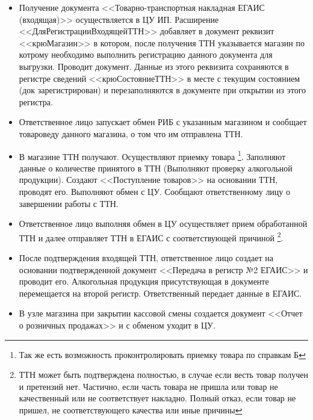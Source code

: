  \begin{itemize}
     \item Получение документа <<Товарно-транспортная накладная ЕГАИС (входящая)>> осуществляется в ЦУ ИП.
     Расширение <<ДляРегистрацииВходящейТТН>> добавляет в документ реквизит <<крюМагазин>> в котором, после получения ТТН указывается магазин по котрому необходимо выполнить регистрацию данного документа для выгрузки. Проводит документ. Данные из этого реквизита сохраняются в регистре сведений <<крюСостояниеТТН>> в месте с текущим состоянием (док зарегистрирован) и перезаполняются в документе при открытии из этого регистра.
     \item  Ответственное лицо запускает обмен РИБ с указанным магазином и сообщает товароведу данного магазина, о том что им отправлена ТТН.
     \item В магазине ТТН получают. Осуществляют приемку товара \footnote{Так же есть возможность проконтролировать приемку товара по справкам Б}. Заполняют данные о количестве принятого в ТТН (Выполняют проверку алкогольной продукции). Создают <<Поступление товаров>> на основании ТТН, проводят его. Выполняют обмен с ЦУ. Сообщают ответственному лицу о завершении работы с ТТН.
     \item Ответственное лицо выполняя обмен в ЦУ осуществляет прием обработанной ТТН и далее отправляет ТТН в ЕГАИС с соответствующей причиной \footnote{ТТН может быть подтверждена полностью, в случае если весть товар получен и претензий нет. Частично, если часть товара не пришла или товар не качественный или не соответствует накладно. Полный отказ, если товар не пришел, не соответствующего качества или иные причины}.
     \item После подтверждения входящей ТТН, ответственное лицо создает на основании подтвержденной документ <<Передача в регистр №2 ЕГАИС>>  и проводит его. Алкогольная продукция присутствующая в документе перемещается на второй регистр. Ответственный передает данные в ЕГАИС.
     \item В узле магазина  при закрытии кассовой смены создается документ <<Отчет о розничных продажах>>  и с обменом уходит в ЦУ.


\end{itemize}
